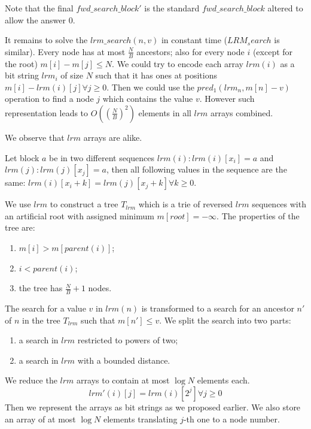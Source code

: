 Note that the final $fwd\_search\_block'$ is the standard $fwd\_search\_block$ altered to allow the answer $0$.

\bigskip

It remains to solve the $lrm\_search(n, v)$ in constant time ($LRM_search$ is similar).
Every node has at most $\frac{N}{B}$ ancestors; also for every node $i$ (except for the root) $m[i] - m[j] \le N$.
We could try to encode each array $lrm(i)$ as a bit string $lrm_i$ of size $N$ such that it has ones at positions $m[i] - lrm(i)[j] \forall j \ge 0$.
Then we could use the $pred_1(lrm_n, m[n] - v)$ operation to find a node $j$ which contains the value $v$.
However such representation leads to $O\left(\left(\frac{N}{B}\right)^2\right)$ elements in all $lrm$ arrays combined.

We observe that $lrm$ arrays are alike.
\begin{lemma}
	Let block $a$ be in two different sequences $lrm(i): lrm(i)[x_i] = a$ and $lrm(j): lrm(j)[x_j] = a$, then all following values in the sequence are the same: $lrm(i)[x_i+k] = lrm(j)[x_j+k] \forall k \ge 0$.
\end{lemma}

We use $lrm$ to construct a tree $T_{lrm}$ which is a trie of reversed $lrm$ sequences with an artificial root with assigned minimum $m[root] = -\infty$.
The properties of the tree are:
\begin{enumerate}
	\item $m[i] > m[parent(i)]$;
	\item $i < parent(i)$;
	\item the tree has $\frac{N}{B} + 1$ nodes.
\end{enumerate}

The search for a value $v$ in $lrm(n)$ is transformed to a search for an ancestor $n'$ of $n$ in the tree $T_{lrm}$ such that $m[n'] \le v$.
We split the search into two parts:
\begin{enumerate}
	\item a search in $lrm$ restricted to powers of two;
	\item a search in $lrm$ with a bounded distance.
\end{enumerate}

We reduce the $lrm$ arrays to contain at most $\log N$ elements each.
$$lrm'(i)[j] = lrm(i)[2^j] \forall j \ge 0$$
Then we represent the arrays as bit strings as we proposed earlier.
We also store an array of at most $\log N$ elements translating $j$-th one to a node number.

